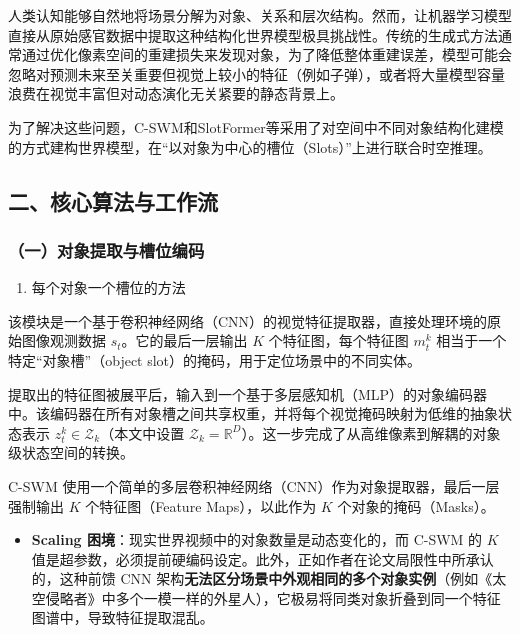 人类认知能够自然地将场景分解为对象、关系和层次结构。然而，让机器学习模型直接从原始感官数据中提取这种结构化世界模型极具挑战性。传统的生成式方法通常通过优化像素空间的重建损失来发现对象，为了降低整体重建误差，模型可能会忽略对预测未来至关重要但视觉上较小的特征（例如子弹），或者将大量模型容量浪费在视觉丰富但对动态演化无关紧要的静态背景上。

为了解决这些问题，C-SWM和SlotFormer等采用了对空间中不同对象结构化建模的方式建构世界模型，在``以对象为中心的槽位（Slots）''上进行联合时空推理。

\hypertarget{ux4e8cux6838ux5fc3ux7b97ux6cd5ux4e0eux5de5ux4f5cux6d41}{%
\subsection{二、核心算法与工作流}\label{ux4e8cux6838ux5fc3ux7b97ux6cd5ux4e0eux5de5ux4f5cux6d41}}

\hypertarget{ux4e00ux5bf9ux8c61ux63d0ux53d6ux4e0eux69fdux4f4dux7f16ux7801}{%
\subsubsection{（一）对象提取与槽位编码}\label{ux4e00ux5bf9ux8c61ux63d0ux53d6ux4e0eux69fdux4f4dux7f16ux7801}}

\begin{enumerate}
\def\labelenumi{\arabic{enumi}.}
\tightlist
\item
  每个对象一个槽位的方法
\end{enumerate}

该模块是一个基于卷积神经网络（CNN）的视觉特征提取器，直接处理环境的原始图像观测数据 \(s_t\)。它的最后一层输出 \(K\) 个特征图，每个特征图 \(m_t^k\) 相当于一个特定``对象槽''（object slot）的掩码，用于定位场景中的不同实体。

提取出的特征图被展平后，输入到一个基于多层感知机（MLP）的对象编码器中。该编码器在所有对象槽之间共享权重，并将每个视觉掩码映射为低维的抽象状态表示 \(z_t^k \in \mathcal{Z}_k\)（本文中设置 \(\mathcal{Z}_k=\mathbb{R}^D\)）。这一步完成了从高维像素到解耦的对象级状态空间的转换。

C-SWM 使用一个简单的多层卷积神经网络（CNN）作为对象提取器，最后一层强制输出 \(K\) 个特征图（Feature Maps），以此作为 \(K\) 个对象的掩码（Masks）。

\begin{itemize}
\tightlist
\item
  \textbf{Scaling 困境}：现实世界视频中的对象数量是动态变化的，而 C-SWM 的 \(K\) 值是超参数，必须提前硬编码设定。此外，正如作者在论文局限性中所承认的，这种前馈 CNN 架构\textbf{无法区分场景中外观相同的多个对象实例}（例如《太空侵略者》中多个一模一样的外星人），它极易将同类对象折叠到同一个特征图谱中，导致特征提取混乱。
\end{itemize}

